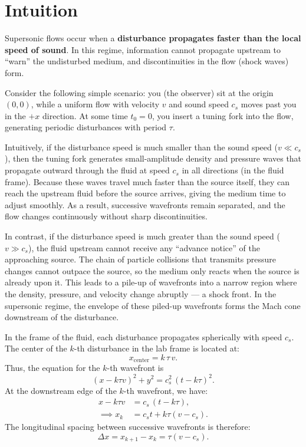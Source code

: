 \section{Intuition}

Supersonic flows occur when a \textbf{disturbance propagates faster than the local speed of sound}. In this regime, information cannot propagate upstream to ``warn'' the undisturbed medium, and discontinuities in the flow (shock waves) form.
\medskip

\noindent
Consider the following simple scenario: you (the observer) sit at the origin $(0,0)$, while a uniform flow with velocity $v$ and sound speed $c_s$ moves past you in the $+x$ direction. At some time $t_0 = 0$, you insert a tuning fork into the flow, generating periodic disturbances with period $\tau$.
\begin{remark}
    Intuitively, if the disturbance speed is much smaller than the sound speed ($v \ll c_s$), then the tuning fork generates small-amplitude density and pressure waves that propagate outward through the fluid at speed $c_s$ in all directions (in the fluid frame). Because these waves travel much faster than the source itself, they can reach the upstream fluid before the source arrives, giving the medium time to adjust smoothly. As a result, successive wavefronts remain separated, and the flow changes continuously without sharp discontinuities.

    In contrast, if the disturbance speed is much greater than the sound speed ($v \gg c_s$), the fluid upstream cannot receive any ``advance notice'' of the approaching source. The chain of particle collisions that transmits pressure changes cannot outpace the source, so the medium only reacts when the source is already upon it. This leads to a pile-up of wavefronts into a narrow region where the density, pressure, and velocity change abruptly --- a shock front. In the supersonic regime, the envelope of these piled-up wavefronts forms the Mach cone downstream of the disturbance.
\end{remark}

In the frame of the fluid, each disturbance propagates spherically with speed $c_s$. The center of the $k$-th disturbance in the lab frame is located at:
\[
x_\mathrm{center} = k\,\tau\, v .
\]
Thus, the equation for the $k$-th wavefront is
\begin{equation}
    (x - k\tau v)^2 + y^2 = c_s^2 \, (t - k\tau)^2 .
\end{equation}
At the downstream edge of the $k$-th wavefront, we have:
\begin{align}
    x - k\tau v &= c_s \, (t - k\tau) , \\
    \implies x_k &= c_s t + k\tau (v - c_s) .
\end{align}
The longitudinal spacing between successive wavefronts is therefore:
\begin{equation}
    \Delta x = x_{k+1} - x_k = \tau (v - c_s) .
\end{equation}


